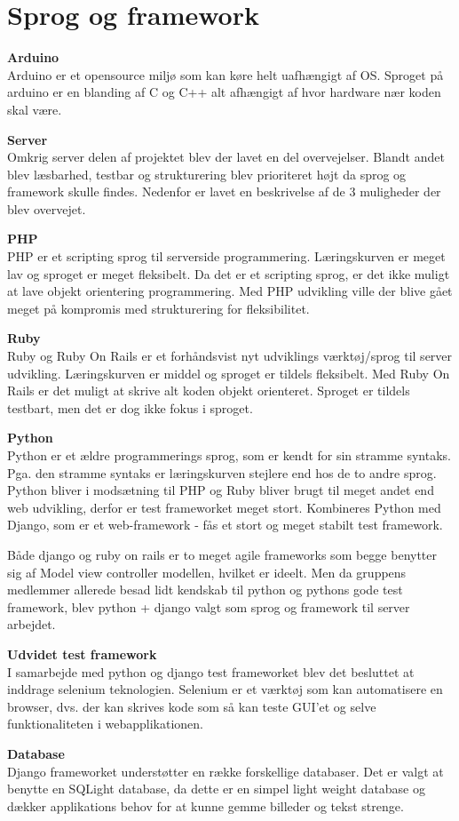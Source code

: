 \section{Sprog og framework}

\textbf{{\LARGE Arduino}} \\
Arduino er et opensource miljø som kan køre helt uafhængigt af OS. Sproget på arduino er en blanding af C og C++ alt afhængigt af hvor hardware nær koden skal være. \newline

\textbf{{\LARGE Server}} \\
Omkrig server delen af projektet blev der lavet en del overvejelser. Blandt andet blev læsbarhed, testbar og strukturering blev prioriteret højt da sprog og framework skulle findes. Nedenfor er lavet en beskrivelse af de 3 muligheder der blev overvejet. \newline

\textbf{PHP}\\
PHP er et scripting sprog til serverside programmering. Læringskurven er meget lav og sproget er meget fleksibelt. Da det er et scripting sprog, er det ikke muligt at lave objekt orientering programmering. Med PHP udvikling ville der blive gået meget på kompromis med strukturering for fleksibilitet. 

\textbf{Ruby} \\
Ruby og Ruby On Rails er et forhåndsvist nyt udviklings værktøj/sprog til server udvikling. Læringskurven er middel og sproget er tildels fleksibelt. Med Ruby On Rails er det muligt at skrive alt koden objekt orienteret. Sproget er tildels testbart, men det er dog ikke fokus i sproget. 

\textbf{Python} \\
Python er et ældre programmerings sprog, som er kendt for sin stramme syntaks. Pga. den stramme syntaks er læringskurven stejlere end hos de to andre sprog.
Python bliver i modsætning til PHP og Ruby bliver brugt til meget andet end web udvikling, derfor er test frameworket meget stort. Kombineres Python med Django, som er et web-framework - fås et stort og meget stabilt test framework. \newline

Både django og ruby on rails er to meget agile frameworks som begge benytter sig af Model view controller modellen, hvilket er ideelt. Men da gruppens medlemmer allerede besad lidt kendskab til python og pythons gode test framework, blev python + django valgt som sprog og framework til server arbejdet.

\newpage

\textbf{Udvidet test framework} \\
I samarbejde med python og django test frameworket blev det besluttet at inddrage selenium teknologien. Selenium er et værktøj som kan automatisere en browser, dvs. der kan skrives kode som så kan teste GUI'et og selve funktionaliteten i webapplikationen. 

\textbf{Database}\\
Django frameworket understøtter en række forskellige databaser. Det er valgt at benytte en SQLight database, da dette er en simpel light weight database og dækker applikations behov for at kunne gemme billeder og tekst strenge. 